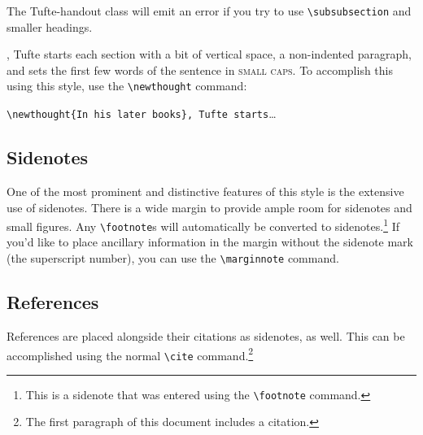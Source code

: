 \documentclass{tufte-handout}
\begin{document}
The Tufte-handout class will emit an error if you try to use
\Verb|\subsubsection| and smaller headings.


,\cite{Tufte2006} Tufte
starts each section with a bit of vertical space, a non-indented paragraph,
and sets the first few words of the sentence in \textsc{small caps}.  To
accomplish this using this style, use the \Verb|\newthought| command:  

\Verb|\newthought{In his later books}, Tufte starts|\ldots

\subsection{Sidenotes}\label{sec:sidenotes}
One of the most prominent and distinctive features of this style is the
extensive use of sidenotes.  There is a wide margin to provide ample room
for sidenotes and small figures.  Any \Verb|\footnote|s will automatically
be converted to sidenotes.\footnote{This is a sidenote that was entered
using the \texttt{\textbackslash footnote} command.}  If you'd like to place ancillary
information in the margin without the sidenote mark (the superscript
number), you can use the \Verb|\marginnote| command.

\subsection{References}
References are placed alongside their citations as sidenotes,
as well.  This can be accomplished using the normal \Verb|\cite|
command.\footnote{The first paragraph of this document includes a citation.}
\end{document}
